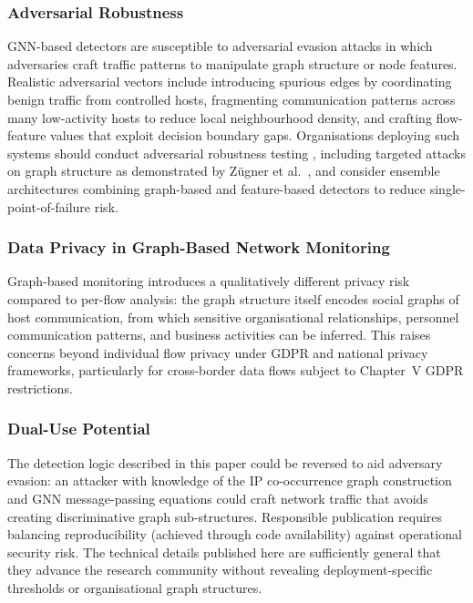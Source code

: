 \documentclass[conference]{IEEEtran}
\begin{document}
\subsubsection{Adversarial Robustness}

GNN-based detectors are susceptible to adversarial evasion attacks in which
adversaries craft traffic patterns to manipulate graph structure or node
features. Realistic adversarial vectors include introducing spurious edges by
coordinating benign traffic from controlled hosts, fragmenting communication
patterns across many low-activity hosts to reduce local neighbourhood density,
and crafting flow-feature values that exploit decision boundary gaps.
Organisations deploying such systems should conduct adversarial robustness
testing \cite{bilot2024}, including targeted attacks on graph structure as
demonstrated by Z\"{u}gner et al.\ \cite{zugner2018adversarial}, and consider
ensemble architectures combining graph-based and feature-based detectors to
reduce single-point-of-failure risk.

\subsubsection{Data Privacy in Graph-Based Network Monitoring}

Graph-based monitoring introduces a qualitatively different privacy risk
compared to per-flow analysis: the graph structure itself encodes social graphs
of host communication, from which sensitive organisational relationships,
personnel communication patterns, and business activities can be inferred.
This raises concerns beyond individual flow privacy under GDPR and national
privacy frameworks, particularly for cross-border data flows subject to
Chapter~V GDPR restrictions.

\subsubsection{Dual-Use Potential}

The detection logic described in this paper could be reversed to aid adversary
evasion: an attacker with knowledge of the IP co-occurrence graph construction
and GNN message-passing equations could craft network traffic that avoids
creating discriminative graph sub-structures. Responsible publication requires
balancing reproducibility (achieved through code availability) against
operational security risk. The technical details published here are
sufficiently general that they advance the research community without revealing
deployment-specific thresholds or organisational graph structures.
\end{document}
